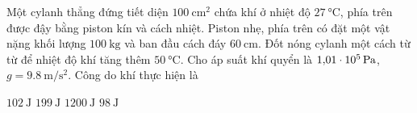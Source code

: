 \begin{ex}
	Một cylanh thẳng đứng tiết diện $\SI{100}{\centi\meter^2}$ chứa khí ở nhiệt độ $\SI{27}{\celsius}$, phía trên được đậy bằng piston kín và cách nhiệt. Piston nhẹ, phía trên có đặt một vật nặng khối lượng $\SI{100}{\kilogram}$ và ban đầu cách đáy $\SI{60}{\centi\meter}$. Đốt nóng cylanh một cách từ từ để nhiệt độ khí tăng thêm $\SI{50}{\celsius}$. Cho áp suất khí quyển là $\SI{1.01E5}{\pascal}$, $g=\SI{9.8}{\meter/\second^2}$. Công do khí thực hiện là 
	
	\choice
	{$\SI{102}{\joule}$}
	{\True $\SI{199}{\joule}$}
	{$\SI{1200}{\joule}$}
	{$\SI{98}{\joule}$}
\end{ex}

